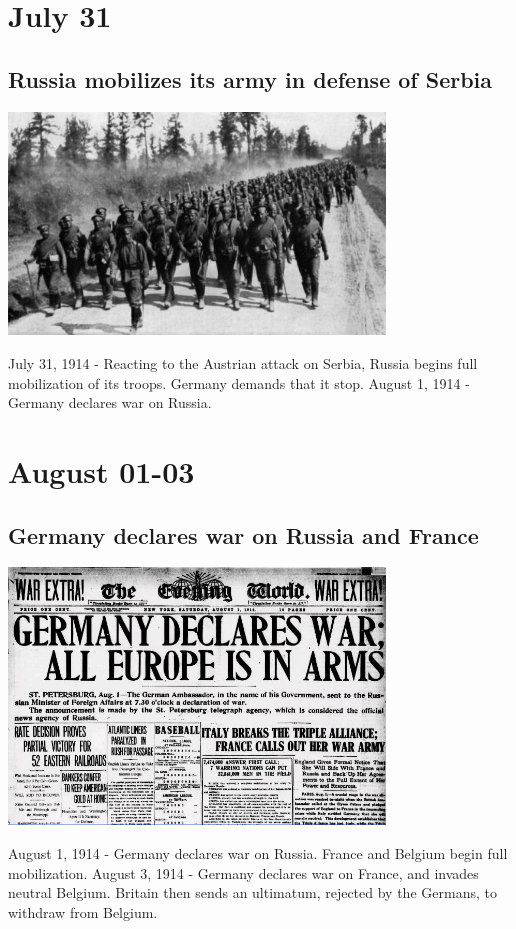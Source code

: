 \documentclass[11pt]{report}
\begin{document}
\section{July 31}
\subsection{Russia mobilizes its army in defense of Serbia}
\vspace{2mm}\begin{center}\includegraphics[width=10cm]{./img/russianTroops.jpg}\end{center}
July 31, 1914 - Reacting to the Austrian attack on Serbia, Russia begins full mobilization of its troops. Germany demands that it stop. August 1, 1914 - Germany declares war on Russia.

\section{August 01-03}
\subsection{Germany declares war on Russia and France}
\vspace{2mm}\begin{center}\includegraphics[width=10cm]{./img/germanyWarDeclaration.jpg}\end{center}
August 1, 1914 - Germany declares war on Russia. France and Belgium begin full mobilization. August 3, 1914 - Germany declares war on France, and invades neutral Belgium. Britain then sends an ultimatum, rejected by the Germans, to withdraw from Belgium.
\end{document}
